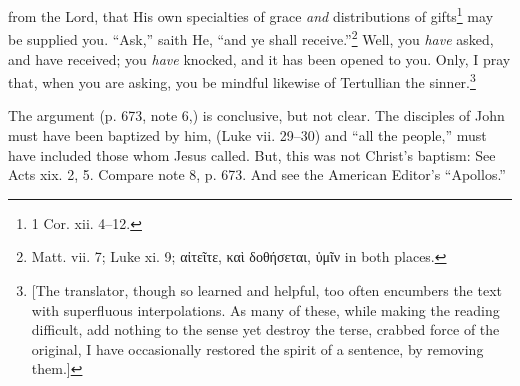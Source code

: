 from the Lord, that His own specialties of grace \emph{and} distributions of gifts\footnote{1 Cor. xii. 4–12.} may be supplied you. “Ask,” saith He, “and ye shall receive.”\footnote{Matt. vii. 7; Luke xi. 9; \textgreek{αἰτεῖτε, καὶ δοθήσεται, ὑμῖν} in both places.} Well, you \emph{have} asked, and have received; you \emph{have} knocked, and it has been opened to you. Only, I pray that, when you are asking, you be mindful likewise of Tertullian the sinner.\footnote{[The translator, though so learned and helpful, too often encumbers the text with superfluous interpolations. As many of these, while making the reading difficult, add nothing to the sense yet destroy the terse, crabbed force of the original, I have occasionally restored the spirit of a sentence, by removing them.]}


The argument (p. 673, note 6,) is conclusive, but not clear. The disciples of John must have been baptized by him, (Luke vii. 29–30) and “all the people,” must have included those whom Jesus called. But, this was not Christ’s baptism: See Acts xix. 2, 5. Compare note 8, p. 673. And see the American Editor’s “Apollos.”
